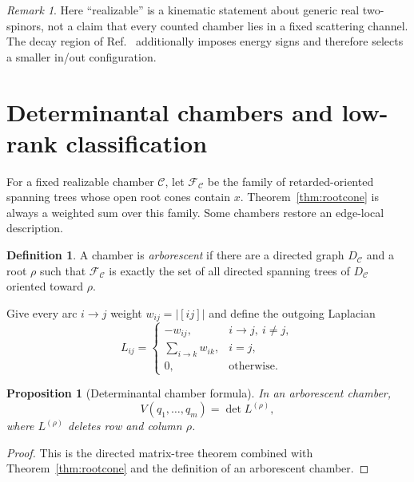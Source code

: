 \documentclass[11pt]{article}
\newtheorem{proposition}[theorem]{Proposition}
\theoremstyle{definition}
\newtheorem{definition}[theorem]{Definition}
\theoremstyle{remark}
\newtheorem{remark}[theorem]{Remark}
\newcommand{\abs}[1]{\lvert #1\rvert}
\begin{document}
\begin{remark}
Here ``realizable'' is a kinematic statement about generic real two-spinors,
not a claim that every counted chamber lies in a fixed scattering channel.
The decay region of Ref.~\cite{GuevaraGraviton} additionally imposes energy
signs and therefore selects a smaller in/out configuration.
\end{remark}

\section{Determinantal chambers and low-rank classification}

For a fixed realizable chamber $\mathcal C$, let $\mathcal F_{\mathcal C}$ be
the family of retarded-oriented spanning trees whose open root cones contain
$x$.  Theorem~\ref{thm:rootcone} is always a weighted sum over this family.
Some chambers restore an edge-local description.

\begin{definition}
A chamber is \emph{arborescent} if there are a directed graph $D_{\mathcal C}$
and a root $\rho$ such that $\mathcal F_{\mathcal C}$ is exactly the set of all
directed spanning trees of $D_{\mathcal C}$ oriented toward $\rho$.
\end{definition}

Give every arc $i\to j$ weight $w_{ij}=\abs{[ij]}$ and define the outgoing
Laplacian
\begin{equation}
  L_{ij}=\begin{cases}
    -w_{ij},&i\to j,\ i\neq j,\\
    \sum_{i\to k}w_{ik},&i=j,\\
    0,&\text{otherwise}.
  \end{cases}
\end{equation}

\begin{proposition}[Determinantal chamber formula]\label{prop:det}
In an arborescent chamber,
\begin{equation}
  V(q_1,\ldots,q_m)=\det L^{(\rho)},
\end{equation}
where $L^{(\rho)}$ deletes row and column $\rho$.
\end{proposition}

\begin{proof}
This is the directed matrix-tree theorem combined with
Theorem~\ref{thm:rootcone} and the definition of an arborescent chamber.
\end{proof}
\end{document}

